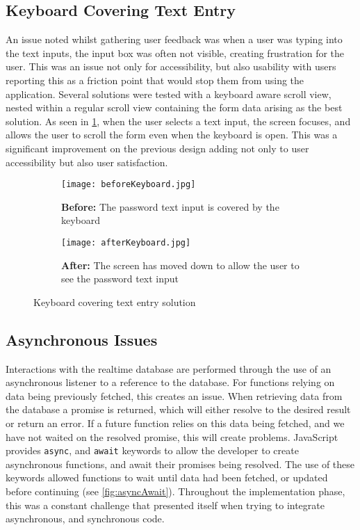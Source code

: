 \subsection*{Keyboard Covering Text Entry}
An issue noted whilst gathering user feedback was when a user was typing into the text inputs, the input box was often not visible, creating frustration for the user. This was an issue not only for accessibility, but also usability with users reporting this as a friction point that would stop them from using the application. Several solutions were tested with a keyboard aware scroll view, nested within a regular scroll view containing the form data arising as the best solution. As seen in \ref{fig:keyboard}, when the user selects a text input, the screen focuses, and allows the user to scroll the form even when the keyboard is open. This was a significant improvement on the previous design adding not only to user accessibility but also user satisfaction.
\begin{figure}[!htbp]
    \centering
    \begin{subfigure}[b]{0.25\textwidth}
        \texttt{[image: beforeKeyboard.jpg]}
        \caption{\textbf{Before:} The password text input is covered by the keyboard}
    \end{subfigure}
    \hspace{1.5em}
    \begin{subfigure}[b]{0.25\textwidth}
        \texttt{[image: afterKeyboard.jpg]}
        \caption{\textbf{After:} The screen has moved down to  allow  the user to see the password text input}
    \end{subfigure}
    \caption{Keyboard covering text entry solution }
    \label{fig:keyboard}
\end{figure}


\subsection*{Asynchronous Issues}
Interactions with the realtime database are performed through the use of an asynchronous listener to a reference to the database. For functions relying on data being previously fetched, this creates an issue. When retrieving data from the database a promise is returned, which will either resolve to the desired result or return an error. If a future function relies on this data being fetched, and we have not waited on the resolved promise, this will create problems. JavaScript provides \texttt{async}, and \texttt{await} keywords to allow the developer to create asynchronous functions, and await their promises being resolved. The use of these keywords allowed functions to wait until data had been fetched, or updated before continuing (see \ref{fig:asyncAwait}). Throughout the implementation phase, this was a constant challenge that presented itself when trying to integrate asynchronous, and synchronous code.

